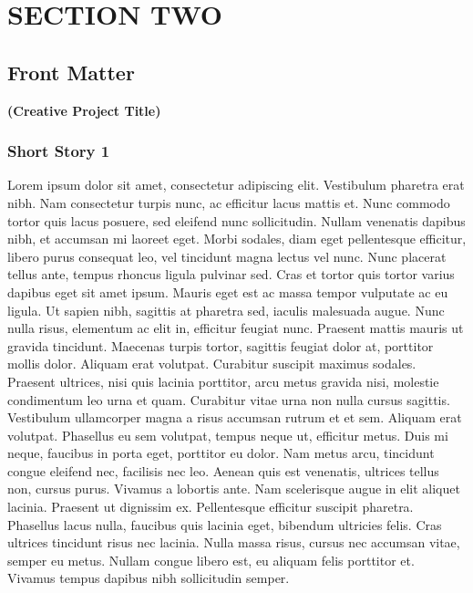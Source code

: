 \documentclass[a4paper]{memoir}
\begin{document}
\part{SECTION TWO}
\label{sectiontwo}

\chapter*{Front Matter}
\label{frontmatter}

\textbf{(Creative Project Title)}

\section{Short Story 1}
\label{shortstory1}

Lorem ipsum dolor sit amet, consectetur adipiscing elit. Vestibulum pharetra erat nibh. Nam consectetur turpis nunc, ac efficitur lacus mattis et. Nunc commodo tortor quis lacus posuere, sed eleifend nunc sollicitudin. Nullam venenatis dapibus nibh, et accumsan mi laoreet eget. Morbi sodales, diam eget pellentesque efficitur, libero purus consequat leo, vel tincidunt magna lectus vel nunc. Nunc placerat tellus ante, tempus rhoncus ligula pulvinar sed. Cras et tortor quis tortor varius dapibus eget sit amet ipsum. Mauris eget est ac massa tempor vulputate ac eu ligula.
Ut sapien nibh, sagittis at pharetra sed, iaculis malesuada augue. Nunc nulla risus, elementum ac elit in, efficitur feugiat nunc. Praesent mattis mauris ut gravida tincidunt. Maecenas turpis tortor, sagittis feugiat dolor at, porttitor mollis dolor. Aliquam erat volutpat. Curabitur suscipit maximus sodales. Praesent ultrices, nisi quis lacinia porttitor, arcu metus gravida nisi, molestie condimentum leo urna et quam.
Curabitur vitae urna non nulla cursus sagittis. Vestibulum ullamcorper magna a risus accumsan rutrum et et sem. Aliquam erat volutpat. Phasellus eu sem volutpat, tempus neque ut, efficitur metus. Duis mi neque, faucibus in porta eget, porttitor eu dolor. Nam metus arcu, tincidunt congue eleifend nec, facilisis nec leo. Aenean quis est venenatis, ultrices tellus non, cursus purus. Vivamus a lobortis ante. Nam scelerisque augue in elit aliquet lacinia. Praesent ut dignissim ex. Pellentesque efficitur suscipit pharetra. Phasellus lacus nulla, faucibus quis lacinia eget, bibendum ultricies felis. Cras ultrices tincidunt risus nec lacinia. Nulla massa risus, cursus nec accumsan vitae, semper eu metus. Nullam congue libero est, eu aliquam felis porttitor et. Vivamus tempus dapibus nibh sollicitudin semper.
\end{document}
